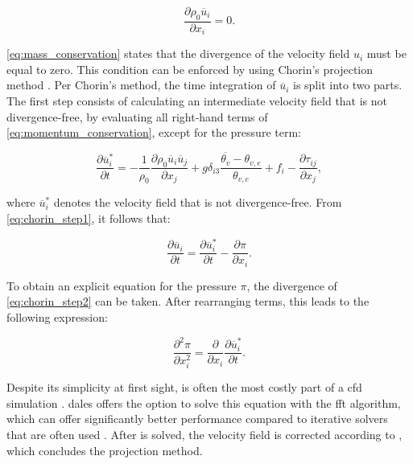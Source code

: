 \begin{equation}
    \frac{\partial \rho_0 \overline{u}_i}{\partial x_i} = 0. \label{eq:mass_conservation}
\end{equation}

\autoref{eq:mass_conservation} states that the divergence of the velocity field $u_i$ must be equal to zero. This condition can be enforced by using Chorin's projection method \citep{chorinNumericalSolutionNavierStokes1967}. Per Chorin's method, the time integration of $\overline{u}_i$ is split into two parts. The first step consists of calculating an intermediate velocity field that is not divergence-free, by evaluating all right-hand terms of \autoref{eq:momentum_conservation}, except for the pressure term:

\begin{equation}
    \frac{\partial \overline{u}^*_i}{\partial t} = - \frac{1}{\rho_0} \frac{\partial \rho_0 \overline{u}_i \overline{u}_j}{\partial x_j} + g \delta_{i3} \frac{\overline{\theta_v} - \theta_{v,e}}{\theta_{v,e}} + f_i - \frac{\partial \tau_{ij}}{\partial x_j}, \label{eq:chorin_step1}
\end{equation}

where $\overline{u}^*_i$ denotes the velocity field that is not divergence-free. From \autoref{eq:chorin_step1}, it follows that:

\begin{equation}
    \frac{\partial \overline{u}_i}{\partial t} = \frac{\partial \overline{u}^*_i}{\partial t} - \frac{\partial \pi}{\partial x_i}. \label{eq:chorin_step2}
\end{equation}

To obtain an explicit equation for the pressure $\pi$, the divergence of \autoref{eq:chorin_step2} can be taken. After rearranging terms, this leads to the following expression:

\begin{equation}
    \frac{\partial^2 \pi}{\partial x_i^2} = \frac{\partial}{\partial x_i} \frac{\partial \overline{u}_i^*}{\partial t}. \label{eq:poisson_equation}
\end{equation}

Despite its simplicity at first sight,  is often the most costly part of a \acrshort{cfd} simulation \citep{costaFFTbasedFinitedifferenceSolver2018}. \acrshort{dales} offers the option to solve this equation with the \acrfull{fft} algorithm, which can offer significantly better performance compared to iterative solvers that are often used \citep{hockneyFastDirectSolution1965}. After  is solved, the velocity field is corrected according to , which concludes the projection method.

